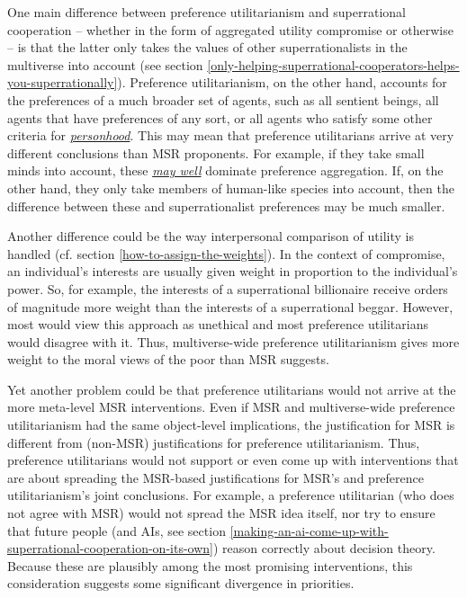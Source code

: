 One main difference between preference utilitarianism and superrational
cooperation -- whether in the form of aggregated utility compromise or
otherwise -- is that the latter only takes the values of other
superrationalists in the multiverse into account (see section
\ref{only-helping-superrational-cooperators-helps-you-superrationally}).
Preference utilitarianism, on the other hand, accounts for the
preferences of a much broader set of agents, such as all sentient
beings, all agents that have preferences of any sort, or all agents who
satisfy some other criteria for
\href{https://en.wikipedia.org/wiki/Personhood}{\emph{personhood}}. This
may mean that preference utilitarians arrive at very different
conclusions than MSR proponents. For example, if they take small minds
into account, these
\href{https://en.wikipedia.org/wiki/Biomass_(ecology)\#Global_biomass}{\emph{may
well}} dominate preference aggregation. If, on the other hand, they only
take members of human-like species into account, then the difference
between these and superrationalist preferences may be much smaller.

Another difference could be the way interpersonal comparison of utility
is handled (cf. section
\ref{how-to-assign-the-weights}). In the context of compromise, an individual's interests
are usually given weight in proportion to the individual's power. So,
for example, the interests of a superrational billionaire receive orders
of magnitude more weight than the interests of a superrational beggar.
However, most would view this approach as unethical and most preference
utilitarians would disagree with it. Thus, multiverse-wide preference
utilitarianism gives more weight to the moral views of the poor than MSR
suggests.

Yet another problem could be that preference utilitarians would not
arrive at the more meta-level MSR interventions. Even if MSR and
multiverse-wide preference utilitarianism had the same object-level
implications, the justification for MSR is different from (non-MSR)
justifications for preference utilitarianism. Thus, preference
utilitarians would not support or even come up with interventions that
are about spreading the MSR-based justifications for MSR's and
preference utilitarianism's joint conclusions. For example, a preference
utilitarian (who does not agree with MSR) would not spread the MSR idea
itself, nor try to ensure that future people (and AIs, see section
\ref{making-an-ai-come-up-with-superrational-cooperation-on-its-own}) reason
correctly about decision theory. Because these are plausibly among the
most promising interventions, this consideration suggests some
significant divergence in priorities.

